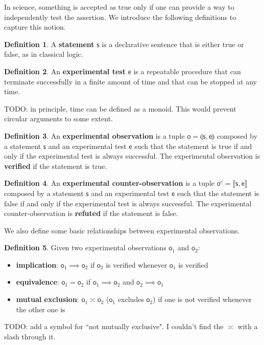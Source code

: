 \documentclass[review]{elsarticle}
\theoremstyle{plain}%
\theoremstyle{definition}
\newtheorem{defn}{Definition}[section]
\theoremstyle{remark}
\begin{document}
In science, something is accepted as true only if one can provide a way to independently test the assertion. We introduce the following definitions to capture this notion.


\begin{defn}
	A \textbf{statement} $\mathsf{s}$ is a declarative sentence that is either true or false, as in classical logic.
\end{defn}

\begin{defn}
	An \textbf{experimental test} $\mathsf{e}$ is a repeatable procedure that can terminate successfully in a finite amount of time and that can be stopped at any time.
\end{defn}

TODO: in principle, time can be defined as a monoid. This would prevent circular arguments to some extent.

\begin{defn}
	An \textbf{experimental observation} is a tuple $\mathsf{o} = \llparenthesis \mathsf{s}, \mathsf{e} \rrparenthesis$ composed by a statement $\mathsf{s}$ and an experimental test $\mathsf{e}$ such that the statement is true if and only if the  experimental test is always successful. The experimental observation is \textbf{verified} if the statement is true.
\end{defn}

\begin{defn}
	An \textbf{experimental counter-observation} is a tuple $\mathsf{o}^c= \llbracket \mathsf{s}, \mathsf{e} \rrbracket$ composed by a statement $\mathsf{s}$ and an experimental test $\mathsf{e}$ such that the statement is false if and only if the experimental test is always successful. The experimental counter-observation is \textbf{refuted} if the statement is false.
\end{defn}

We also define some basic relationships between experimental observations.

\begin{defn}
	Given two experimental observations $\mathsf{o}_1$ and $\mathsf{o}_2$:
	\begin{itemize}
	\item \textbf{implication}: $\mathsf{o}_1 \implies \mathsf{o}_2$ if $\mathsf{o}_2$ is verified whenever $\mathsf{o}_1$ is verified
	\item \textbf{equivalence}: $\mathsf{o}_1 = \mathsf{o}_2$ if $\mathsf{o}_1 \implies \mathsf{o}_2$ and $\mathsf{o}_2 \implies \mathsf{o}_1$
	\item \textbf{mutual exclusion}: $\mathsf{o}_1 \asymp \mathsf{o}_2$ ($\mathsf{o}_1$ excludes $\mathsf{o}_2$) if one is not verified whenever the other one is
	\end{itemize}
\end{defn}
TODO: add a symbol for ``not mutually exclusive". I couldn't find the $\asymp$ with a slash through it. 
\end{document}
